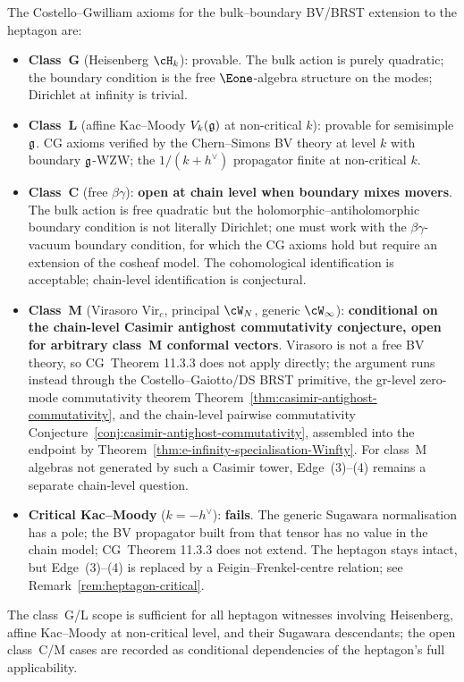 \begin{remark}
\label{rem:edge-34-scope}%
The Costello--Gwilliam axioms for the bulk--boundary BV/BRST
extension to the heptagon are:
\begin{itemize}
\item \textbf{Class~G} (Heisenberg $\cH_k$): provable. The bulk
action is purely quadratic; the boundary condition is the free
$\Eone$-algebra structure on the modes; Dirichlet at infinity is
trivial.
\item \textbf{Class~L} (affine Kac--Moody $V_k(\mathfrak{g})$ at non-critical
$k$): provable for semisimple $\mathfrak{g}$. CG axioms verified by the
Chern--Simons BV theory at level $k$ with boundary $\mathfrak{g}$-WZW; the
$1/(k+h^\vee)$ propagator finite at non-critical $k$.
\item \textbf{Class~C} (free $\beta\gamma$): \textbf{open at chain level
when boundary mixes movers}. The bulk action is free quadratic but the
holomorphic--antiholomorphic boundary condition is not literally
Dirichlet; one must work with the $\beta\gamma$-vacuum boundary
condition, for which the CG axioms hold but require an extension of
the cosheaf model. The cohomological identification is acceptable;
chain-level identification is conjectural.
\item \textbf{Class~M} (Virasoro $\mathrm{Vir}_c$, principal $\cW_N$,
generic $\cW_\infty$): \textbf{conditional on the chain-level Casimir
antighost commutativity conjecture, open for arbitrary class~M
conformal vectors}. Virasoro is not a free
BV theory, so CG~Theorem 11.3.3 does not apply directly; the argument
runs instead through the Costello--Gaiotto/DS BRST primitive, the
gr-level zero-mode commutativity theorem
Theorem~\ref{thm:casimir-antighost-commutativity}, and the
chain-level pairwise commutativity
Conjecture~\ref{conj:casimir-antighost-commutativity}, assembled into
the endpoint by Theorem~\ref{thm:e-infinity-specialisation-Winfty}.
For class~M algebras not generated by such a Casimir tower,
Edge~(3)--(4) remains a separate chain-level question.
\item \textbf{Critical Kac--Moody} ($k=-h^\vee$): \textbf{fails}. The
generic Sugawara normalisation has a pole; the BV propagator built from
that tensor has no value in the chain model; CG~Theorem 11.3.3 does not
extend. The heptagon stays
intact, but Edge~(3)--(4) is replaced by a Feigin--Frenkel-centre
relation; see Remark~\ref{rem:heptagon-critical}.
\end{itemize}
The class~G/L scope is sufficient for all heptagon witnesses
involving Heisenberg, affine Kac--Moody at non-critical level, and
their Sugawara descendants; the open class~C/M cases are recorded as
conditional dependencies of the heptagon's full applicability.
\end{remark}

